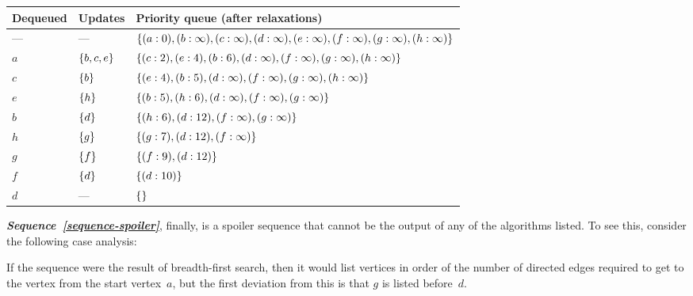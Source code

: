 \documentclass{jn-pset}
\begin{document}
\begin{problem}
\begin{solution}
  \medskip
  \noindent
  \begin{tabular}[]{|l|l|l|}
    \hline
    \textbf{Dequeued}
    &
      \textbf{Updates}
    &
      \textbf{Priority queue (after relaxations)}
    \\
    \hline
    ---
    &
      ---
    &
      $
      \{ 
      (a: 0),
      (b: \infty),
      (c: \infty),
      (d: \infty),
      (e: \infty),
      (f: \infty),
      (g: \infty),
      (h: \infty)
       \}
      $
    \\
    $a$
    &
      $\{ b, c, e \}$
    &
      $
      \{ 
      (c: 2),
      (e: 4),
      (b: 6),
      (d: \infty),
      (f: \infty),
      (g: \infty),
      (h: \infty)
       \}
      $
    \\
    $c$
    &
      $\{ b \}$
    &
      $
      \{ 
      (e: 4),
      (b: 5),
      (d: \infty),
      (f: \infty),
      (g: \infty),
      (h: \infty)
       \}
      $
    \\
    $e$
    &
      $\{ h \}$
    &
      $
      \{ 
      (b: 5),
      (h: 6),      
      (d: \infty),
      (f: \infty),
      (g: \infty)
       \}
      $
    \\
    $b$
    &
      $\{ d \}$
    &
      $
      \{ 
      (h: 6),      
      (d: 12),
      (f: \infty),
      (g: \infty)
       \}
      $
    \\
    $h$
    &
      $\{ g \}$
    &
      $
      \{ 
      (g: 7),      
      (d: 12),
      (f: \infty)
       \}
      $
    \\
    $g$
    &
      $\{ f \}$
    &
      $
      \{ 
      (f: 9),      
      (d: 12)
       \}
      $
    \\
    $f$
    &
      $\{ d \}$
    &
      $
      \{ 
      (d: 10)
       \}
      $
    \\
    $d$
    &
      ---
    &
      $
      \{ 
       \}
      $
    \\
    \hline
  \end{tabular}

  \bigskip
  
  \textit{\textbf{Sequence~\ref{sequence-spoiler}}}, finally,
  is a spoiler sequence that cannot be the output of any of the
  algorithms listed. To see this, consider the following case
  analysis:
  \begin{compactitem}
  \item
    If the sequence were the result of breadth-first search,
    then it would list vertices in order of the number of directed
    edges required to get to the vertex     from
    the start vertex~$a$, but the first deviation from this is that
    $g$ is listed before~$d$.
    

\end{compactitem}
\end{solution}
\end{problem}
\end{document}
